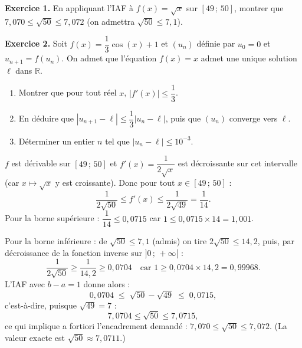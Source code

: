 \documentclass[11pt]{article}
\begin{document}
\begin{exercice}
\textbf{Exercice 1.} En appliquant l'IAF à $f(x) = \sqrt{x}$ sur $[49\,;\,50]$, montrer que $7{,}070 \leq \sqrt{50} \leq 7{,}072$ (on admettra $\sqrt{50} \leq 7{,}1$).

\textbf{Exercice 2.} Soit $f(x) = \dfrac{1}{3}\cos(x) + 1$ et $(u_n)$ définie par $u_0 = 0$ et $u_{n+1} = f(u_n)$. On admet que l'équation $f(x) = x$ admet une unique solution $\ell$ dans $\mathbb{R}$.
\begin{enumerate}
\item Montrer que pour tout réel $x$, $|f'(x)| \leq \dfrac{1}{3}$.
\item En déduire que $|u_{n+1} - \ell| \leq \dfrac{1}{3}|u_n - \ell|$, puis que $(u_n)$ converge vers $\ell$.
\item Déterminer un entier $n$ tel que $|u_n - \ell| \leq 10^{-3}$.
\end{enumerate}
\end{exercice}

\begin{corrige}[Exercice 1]
$f$ est dérivable sur $[49\,;\,50]$ et $f'(x) = \dfrac{1}{2\sqrt{x}}$ est décroissante sur cet intervalle (car $x \mapsto \sqrt{x}$ y est croissante). Donc pour tout $x \in [49\,;\,50]$ :
\[ \frac{1}{2\sqrt{50}} \leq f'(x) \leq \frac{1}{2\sqrt{49}} = \frac{1}{14}. \]
Pour la borne supérieure : $\dfrac{1}{14} \leq 0{,}0715$ car $1 \leq 0{,}0715 \times 14 = 1{,}001$.

Pour la borne inférieure : de $\sqrt{50} \leq 7{,}1$ (admis) on tire $2\sqrt{50} \leq 14{,}2$, puis, par décroissance de la fonction inverse sur $]0\,;\,+\infty[$ :
\[ \frac{1}{2\sqrt{50}} \geq \frac{1}{14{,}2} \geq 0{,}0704 \quad \text{car } 1 \geq 0{,}0704 \times 14{,}2 = 0{,}99968. \]
L'IAF avec $b - a = 1$ donne alors :
\[ 0{,}0704 \;\leq\; \sqrt{50} - \sqrt{49} \;\leq\; 0{,}0715, \]
c'est-à-dire, puisque $\sqrt{49} = 7$ :
\[ 7{,}0704 \leq \sqrt{50} \leq 7{,}0715, \]
ce qui implique a fortiori l'encadrement demandé : $7{,}070 \leq \sqrt{50} \leq 7{,}072$. (La valeur exacte est $\sqrt{50} \approx 7{,}0711$.)
\end{corrige}
\end{document}
